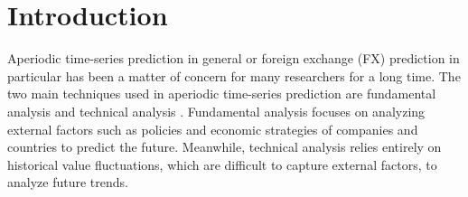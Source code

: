 \documentclass[aps,prb,groupedaddress,twocolumn,showpacs,dvipdfmx,superscriptaddress,pdftex]{revtex4-2}
\begin{document}
\section{Introduction}
\label{sec.intro}


Aperiodic time-series prediction in general or foreign exchange (FX) prediction in particular has been a matter of concern for many researchers \citep{li2019multi, islam2021foreign, heryadi2021foreign} for a long time. The two main techniques used in aperiodic time-series prediction are fundamental analysis and technical analysis \cite{ayitey2023forex}. Fundamental analysis focuses on analyzing external factors such as policies and economic strategies of companies and countries to predict the future. Meanwhile, technical analysis relies entirely on historical value fluctuations, which are difficult to capture external factors, to analyze future trends.

\vspace{2mm}

\end{document}
